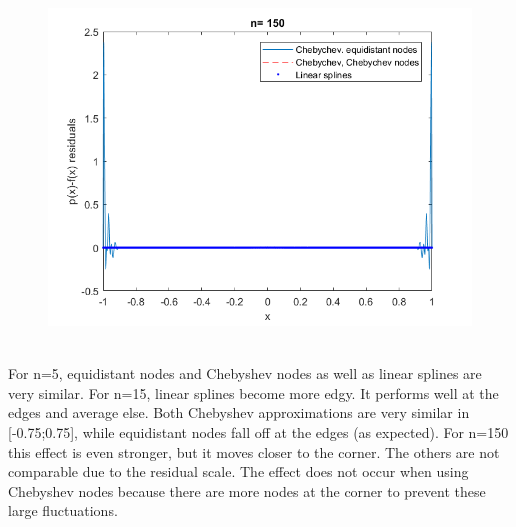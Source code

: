 \documentclass{article}
\begin{document}
\begin{figure}[h]
\begin{minipage}{0.56\textwidth}
   	  	\includegraphics[width = \textwidth, keepaspectratio]{n150res.png}
   	  \end{minipage}   	   
    \end{figure}\\
   For n=5, equidistant nodes and Chebyshev nodes as well as linear splines are very similar. For n=15, linear splines become more edgy. It performs well at the edges and average else. Both Chebyshev approximations are very similar in [-0.75;0.75], while equidistant nodes fall off at the edges (as expected). For n=150 this effect is even stronger, but it moves closer to the corner. The others are not comparable due to the residual scale. The effect does not occur when using Chebyshev nodes because there are more nodes at the corner to prevent these large fluctuations.\\
\end{document}
